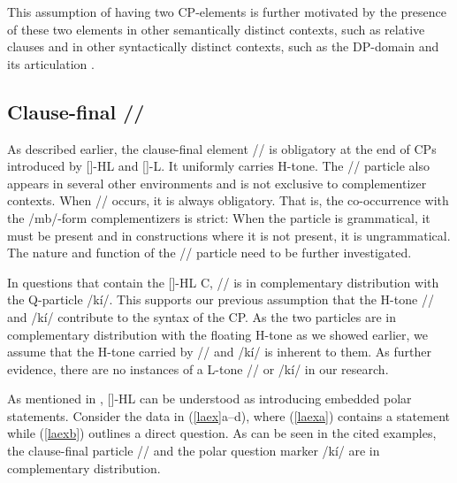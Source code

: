 \documentclass[output=paper,colorlinks,citecolor=brown]{langscibook}
\begin{document}
This assumption of having two CP-elements is further motivated by the presence of these two elements in other semantically distinct contexts, such as relative clauses \citep{Kouankem2011} and in other syntactically distinct contexts, such as the DP-domain and its articulation \citep{Kouankem2011, Kouankem2012}.

\subsection{Clause-final /\la/}

As described earlier, the clause-final element /\la/ is obligatory at the end of CPs introduced by [\mbuHL]-HL and [\nda]-L. It uniformly carries H-tone. The /\la/ particle also appears in several other environments and is not exclusive to complementizer contexts. When /\la/ occurs, it is always obligatory. That is, the co-occurrence with the /mb\baru/-form complementizers is strict: When the particle is grammatical, it must be present and in constructions where it is not present, it is ungrammatical. The nature and function of the /\la/ particle need to be further investigated.

In questions that contain the [\mbuHL]-HL C, /\la/ is in complementary distribution with the Q-particle /k{í}/. This supports our previous assumption that the H-tone /\la/ and /k{í}/ contribute to the syntax of the CP. As the two particles are in complementary distribution with the floating H-tone as we showed earlier, we assume that the H-tone carried by /\la/ and /k{í}/ is inherent to them. As further evidence, there are no instances of a L-tone /\la/ or /k{í}/ in our research.

As mentioned in , [\mbuHL]-HL can be understood as introducing embedded polar statements. Consider the data in (\ref{laex}a--d), where (\ref{laexa}) contains a statement while (\ref{laexb}) outlines a direct question. As can be seen in the cited examples, the clause-final particle /\la/ and the polar question marker /k{í}/ are in complementary distribution.
\end{document}
